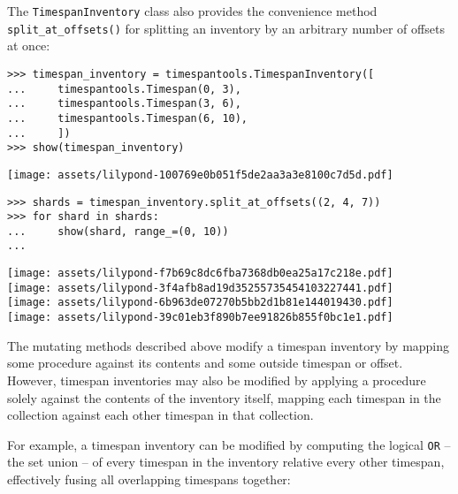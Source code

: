 \noindent The \texttt{TimespanInventory} class also provides the convenience
method \texttt{split\_at\_offsets()} for splitting an inventory by an arbitrary
number of offsets at once:

\begin{comment}
<abjad>
timespan_inventory = timespantools.TimespanInventory([
    timespantools.Timespan(0, 3),
    timespantools.Timespan(3, 6),
    timespantools.Timespan(6, 10),
    ])
show(timespan_inventory)
shards = timespan_inventory.split_at_offsets((2, 4, 7))
for shard in shards:
    show(shard, range_=(0, 10))

</abjad>
\end{comment}

\begin{singlespacing}
\vspace{-0.5\baselineskip}
\begin{lstlisting}
>>> timespan_inventory = timespantools.TimespanInventory([
...     timespantools.Timespan(0, 3),
...     timespantools.Timespan(3, 6),
...     timespantools.Timespan(6, 10),
...     ])
>>> show(timespan_inventory)
\end{lstlisting}
\noindent\texttt{[image: assets/lilypond-100769e0b051f5de2aa3a3e8100c7d5d.pdf]}
\begin{lstlisting}
>>> shards = timespan_inventory.split_at_offsets((2, 4, 7))
>>> for shard in shards:
...     show(shard, range_=(0, 10))
...
\end{lstlisting}
\noindent\texttt{[image: assets/lilypond-f7b69c8dc6fba7368db0ea25a17c218e.pdf]}\\
\noindent\texttt{[image: assets/lilypond-3f4afb8ad19d35255735454103227441.pdf]}\\
\noindent\texttt{[image: assets/lilypond-6b963de07270b5bb2d1b81e144019430.pdf]}\\
\noindent\texttt{[image: assets/lilypond-39c01eb3f890b7ee91826b855f0bc1e1.pdf]}
\end{singlespacing}

The mutating methods described above modify a timespan inventory
by mapping some procedure against its contents and some outside timespan or
offset. However, timespan inventories may also be modified by applying a
procedure solely against the contents of the inventory itself, mapping each
timespan in the collection against each other timespan in that collection.

For example, a timespan inventory can be modified by computing the logical
\texttt{OR} -- the set union -- of every timespan in the inventory relative
every other timespan, effectively fusing all overlapping timespans together:

